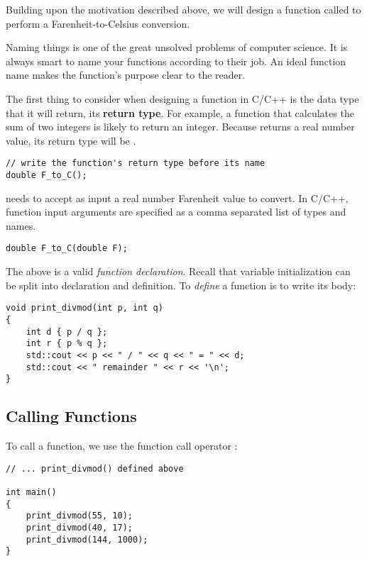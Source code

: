 \noindent
Building upon the motivation described above, we will design a function called  to perform a Farenheit-to-Celsius conversion.

\begin{advice}
Naming things is one of the great unsolved problems of computer science.
It is always smart to name your functions according to their job.
An ideal function name makes the function's purpose clear to the reader.
\end{advice}

\noindent
The first thing to consider when designing a function in C/C++ is the data type that it will {return}, its \textbf{return type}.
For example, a function that calculates the sum of two integers is likely to return an integer.
Because  returns a real number value, its return type will be .
\begin{lstlisting}[style=cxx]
// write the function's return type before its name
double F_to_C();
\end{lstlisting}

\noindent
{} needs to accept as input a real number Farenheit value to convert.
In C/C++, function input arguments are specified as a comma separated list of types and names.

\begin{lstlisting}[style=cxx]
double F_to_C(double F);
\end{lstlisting}

\noindent
The above is a valid \textit{function declaration}. Recall that variable initialization can be split into declaration and definition. To \textit{define} a function is to write its body:

\begin{lstlisting}[style=cxx]
void print_divmod(int p, int q)
{
	int d { p / q };
	int r { p % q };
    std::cout << p << " / " << q << " = " << d;
    std::cout << " remainder " << r << '\n';
}
\end{lstlisting}

\subsection{Calling Functions}

\noindent
To call a function, we use the function call operator \inlinecxx{()}:

\begin{lstlisting}[style=cxx]
// ... print_divmod() defined above

int main()
{
    print_divmod(55, 10);
    print_divmod(40, 17);
    print_divmod(144, 1000);
}
\end{lstlisting}

